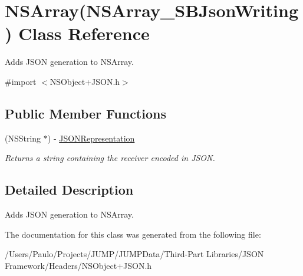 \hypertarget{interface_n_s_array_07_n_s_array___s_b_json_writing_08}{
\section{NSArray(NSArray\_\-SBJsonWriting) Class Reference}
\label{interface_n_s_array_07_n_s_array___s_b_json_writing_08}
}


Adds JSON generation to NSArray.  




{\ttfamily \#import $<$NSObject+JSON.h$>$}

\subsection*{Public Member Functions}
\begin{DoxyCompactItemize}
\item 
\hypertarget{interface_n_s_array_07_n_s_array___s_b_json_writing_08_abc4a65dd7aae29463ee51012ec5dcb6e}{
(NSString $\ast$) -\/ \hyperlink{interface_n_s_array_07_n_s_array___s_b_json_writing_08_abc4a65dd7aae29463ee51012ec5dcb6e}{JSONRepresentation}}
\label{interface_n_s_array_07_n_s_array___s_b_json_writing_08_abc4a65dd7aae29463ee51012ec5dcb6e}

\begin{DoxyCompactList}\small\item\em Returns a string containing the receiver encoded in JSON. \item\end{DoxyCompactList}\end{DoxyCompactItemize}


\subsection{Detailed Description}
Adds JSON generation to NSArray. 

The documentation for this class was generated from the following file:\begin{DoxyCompactItemize}
\item 
/Users/Paulo/Projects/JUMP/JUMPData/Third-\/Part Libraries/JSON Framework/Headers/NSObject+JSON.h\end{DoxyCompactItemize}
